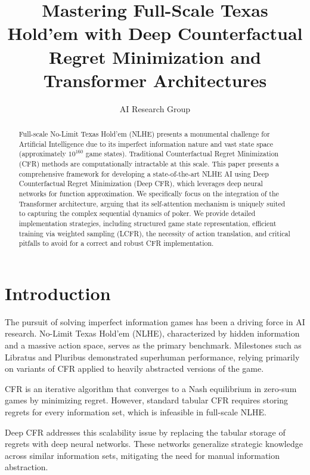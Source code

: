 \documentclass[11pt,a4paper]{article}
\title{Mastering Full-Scale Texas Hold'em with Deep Counterfactual Regret Minimization and Transformer Architectures}
\author[1]{AI Research Group}
\affil[1]{}
\date{}
\begin{document}
\maketitle

\begin{abstract}
Full-scale No-Limit Texas Hold'em (NLHE) presents a monumental challenge for Artificial Intelligence due to its imperfect information nature and vast state space (approximately $10^{160}$ game states). Traditional Counterfactual Regret Minimization (CFR) methods are computationally intractable at this scale. This paper presents a comprehensive framework for developing a state-of-the-art NLHE AI using Deep Counterfactual Regret Minimization (Deep CFR), which leverages deep neural networks for function approximation. We specifically focus on the integration of the Transformer architecture, arguing that its self-attention mechanism is uniquely suited to capturing the complex sequential dynamics of poker. We provide detailed implementation strategies, including structured game state representation, efficient training via weighted sampling (LCFR), the necessity of action translation, and critical pitfalls to avoid for a correct and robust CFR implementation.
\end{abstract}

\section{Introduction}

The pursuit of solving imperfect information games has been a driving force in AI research. No-Limit Texas Hold'em (NLHE), characterized by hidden information and a massive action space, serves as the primary benchmark. Milestones such as Libratus \cite{brown2017superhuman} and Pluribus \cite{brown2019superhuman} demonstrated superhuman performance, relying primarily on variants of CFR applied to heavily abstracted versions of the game.

CFR \cite{zinkevich2007regret} is an iterative algorithm that converges to a Nash equilibrium in zero-sum games by minimizing regret. However, standard tabular CFR requires storing regrets for every information set, which is infeasible in full-scale NLHE.

Deep CFR \cite{brown2018deep} addresses this scalability issue by replacing the tabular storage of regrets with deep neural networks. These networks generalize strategic knowledge across similar information sets, mitigating the need for manual information abstraction.
\end{document}
